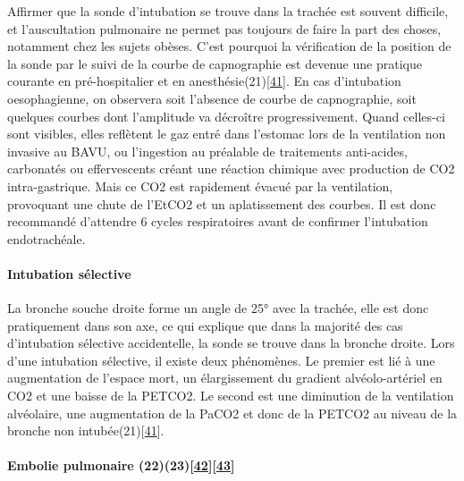 \documentclass[12pt,]{article}
\let\oldparagraph\paragraph
\renewcommand{\paragraph}[1]{\oldparagraph{#1}\mbox{}}
\begin{document}
Affirmer que la sonde d'intubation se trouve dans la trachée est souvent
difficile, et l'auscultation pulmonaire ne permet pas toujours de faire
la part des choses, notamment chez les sujets obèses. C'est pourquoi la
vérification de la position de la sonde par le suivi de la courbe de
capnographie est devenue une pratique courante en pré-hospitalier et en
anesthésie(21){[}\protect\hyperlink{ref-jung2008modalites}{41}{]}. En
cas d'intubation oesophagienne, on observera soit l'absence de courbe de
capnographie, soit quelques courbes dont l'amplitude va décroître
progressivement. Quand celles-ci sont visibles, elles reflètent le gaz
entré dans l'estomac lors de la ventilation non invasive au BAVU, ou
l'ingestion au préalable de traitements anti-acides, carbonatés ou
effervescents créant une réaction chimique avec production de CO2
intra-gastrique. Mais ce CO2 est rapidement évacué par la ventilation,
provoquant une chute de l'EtCO2 et un aplatissement des courbes. Il est
donc recommandé d'attendre 6 cycles respiratoires avant de confirmer
l'intubation endotrachéale.

\hypertarget{intubation-suxe9lective}{%
\paragraph{Intubation sélective}\label{intubation-suxe9lective}}

La bronche souche droite forme un angle de 25° avec la trachée, elle est
donc pratiquement dans son axe, ce qui explique que dans la majorité des
cas d'intubation sélective accidentelle, la sonde se trouve dans la
bronche droite. Lors d'une intubation sélective, il existe deux
phénomènes. Le premier est lié à une augmentation de l'espace mort, un
élargissement du gradient alvéolo-artériel en CO2 et une baisse de la
PETCO2. Le second est une diminution de la ventilation alvéolaire, une
augmentation de la PaCO2 et donc de la PETCO2 au niveau de la bronche
non intubée(21){[}\protect\hyperlink{ref-jung2008modalites}{41}{]}.

\hypertarget{embolie-pulmonaire-2223kline1998preliminarywiegand2000effectiveness}{%
\paragraph{\texorpdfstring{Embolie pulmonaire
(22)(23){[}\protect\hyperlink{ref-kline1998preliminary}{42}{]}{[}\protect\hyperlink{ref-wiegand2000effectiveness}{43}{]}}{Embolie pulmonaire (22)(23){[}42{]}{[}43{]}}}\label{embolie-pulmonaire-2223kline1998preliminarywiegand2000effectiveness}}
\end{document}
